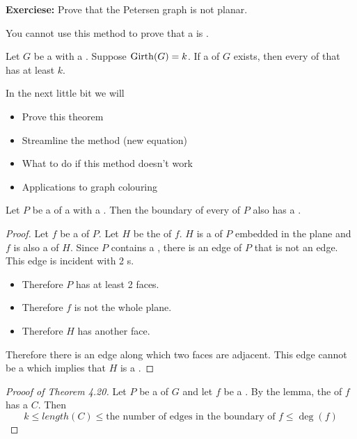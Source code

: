 \documentclass[english, 11pt]{article}
\begin{document}
 \textbf{Exerciese:} Prove that the Petersen graph is not planar.

 \begin{note}
   You cannot use this method to prove that a  is .
 \end{note}

  \begin{thrm}
   Let $G$ be a  with a . Suppose $\operatorname{Girth}(G) = k$. If a  of $G$ exists, then every  of that  has  at least $k$.
 \end{thrm}

 In the next little bit we will

 \begin{itemize}
   \item Prove this theorem
   \item Streamline the method (new equation)
   \item What to do if this method doesn't work
   \item Applications to graph colouring
 \end{itemize}

 \begin{lem}
   Let $P$ be a  of a  with a . Then the boundary of every  of $P$ also has a .
 \end{lem}

 \begin{proof}
   Let $f$ be a  of $P$. Let $H$ be the  of $f$. $H$ is a  of $P$ embedded in the plane and $f$ is also a  of $H$. Since $P$ contains a , there is an edge of $P$ that is not an edge. This edge is incident with 2 s.
   \begin{itemize}
     \item Therefore $P$ has at least 2 faces.
     \item Therefore $f$ is not the whole plane.
     \item Therefore $H$ has another face.
   \end{itemize}
   Therefore there is an edge along which two faces are adjacent. This edge cannot be a  which implies that $H$ is a .
 \end{proof}

 \begin{proof}[Prooof of Theorem 4.20]
   Let $P$ be a  of $G$ and let $f$ be a . By the lemma, the  of $f$ has a  $C$. Then
   \[ k \leq length(C) \leq \mbox{the number of edges in the boundary of $f$} \leq \deg(f) \]
 \end{proof}
\end{document}
